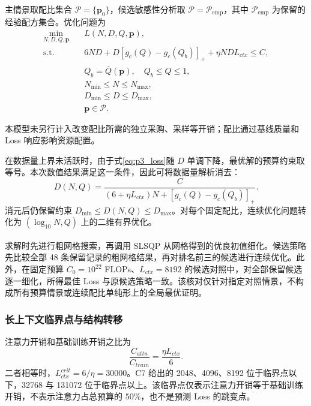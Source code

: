 \documentclass[bwprint]{gmcmthesis}
\numberwithin{equation}{section}
\numberwithin{figure}{section}
\numberwithin{table}{section}
\begin{document}
        主情景取配比集合 $\mathcal P=\{\bm p_0\}$，候选敏感性分析取 $\mathcal P=\mathcal P_{\mathrm{emp}}$，其中 $\mathcal P_{\mathrm{emp}}$ 为保留的经验配方集合。优化问题为
        \begin{equation}
        \begin{aligned}
        \min_{N,D,Q,\bm p}\quad &L(N,D,Q,\bm p),\\
        \mathrm{s.t.}\quad
        &6ND+D[g_c(Q)-g_c(Q_b)]_++\eta NDL_{ctx}\le C,\\
        &Q_b=\bar Q(\bm p),\quad Q_b\le Q\le1,\\
        &N_{\min}\le N\le N_{\max},\\
        &D_{\min}\le D\le D_{\max},\\
        &\bm p\in\mathcal P.
        \end{aligned}
        \label{eq:p3_optimization}
        \end{equation}

        本模型未另行计入改变配比所需的独立采购、采样等开销；配比通过基线质量和 Loss 响应影响资源配置。

        在数据量上界未活跃时，由于式\eqref{eq:p3_loss}随 $D$ 单调下降，最优解的预算约束取等号。本次数值结果满足这一条件，因此可将数据量解析消去：
        \begin{equation}
        D(N,Q)=\frac{C}{(6+\eta L_{ctx})N+[g_c(Q)-g_c(Q_b)]_+}.
        \label{eq:p3_eliminate_d}
        \end{equation}
        消元后仍保留约束 $D_{\min}\le D(N,Q)\le D_{\max}$。对每个固定配比，连续优化问题转化为 $(\log_{10}N,Q)$ 上的二维有界优化。

        求解时先进行粗网格搜索，再调用 SLSQP 从网格得到的优良初值细化\textsuperscript{\cite{virtanen2020scipy}}。候选策略先比较全部 48 条保留记录的粗网格结果，再对排名前三的候选进行连续优化。此外，在固定预算 $C_0=10^{22}$ FLOPs、$L_{ctx}=8192$ 的候选对照中，对全部保留候选逐一细化，所得最佳 Loss 与原候选策略一致。该核对仅针对指定对照情景，不构成所有预算情景或连续配比单纯形上的全局最优证明。

        \subsubsection{长上下文临界点与结构转移}

        注意力开销和基础训练开销之比为
        \begin{equation}
        \frac{C_{attn}}{C_{train}}=\frac{\eta L_{ctx}}{6}.
        \label{eq:p3_attention_ratio}
        \end{equation}
        二者相等时，$L_{ctx}^{crit}=6/\eta=30000$。C7 给出的 2048、4096、8192 位于临界点以下，32768 与 131072 位于临界点以上。该临界点仅表示注意力开销等于基础训练开销，不表示注意力占总预算的 $50\%$，也不是预测 Loss 的跳变点。
\end{document}
